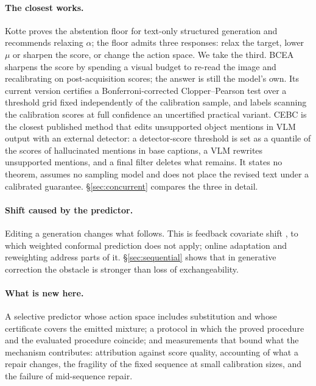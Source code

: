 \paragraph{The closest works.}
Kotte \citep{crcimposs} proves the abstention floor for text-only structured generation and
recommends relaxing $\alpha$; the floor admits three responses: relax the target, lower $\mu$ or
sharpen the score, or change the action space. We take the third. BCEA \citep{bcea} sharpens the
score by spending a visual budget to re-read the image and recalibrating on post-acquisition
scores; the answer is still the model's own. Its current version certifies a Bonferroni-corrected
Clopper--Pearson test over a threshold grid fixed independently of the calibration sample, and
labels scanning the calibration scores at full confidence an uncertified practical variant.
CEBC \citep{mishra2026cebc} is the closest published method that edits unsupported object
mentions in VLM output with an external detector: a detector-score threshold is set as a
quantile of the scores of hallucinated mentions in base captions, a VLM rewrites unsupported
mentions, and a final filter deletes what remains. It states no theorem, assumes no sampling
model and does not place the revised text under a calibrated guarantee. \S\ref{sec:concurrent}
compares the three in detail.

\paragraph{Shift caused by the predictor.}
Editing a generation changes what follows. This is feedback covariate shift
\citep{fannjiang2022fcs}, to which weighted conformal prediction \citep{tibshirani2019} does not
apply; online adaptation \citep{gibbs2021,onlineabstention} and reweighting \citep{anydist}
address parts of it. \S\ref{sec:sequential} shows that in generative correction the obstacle is
stronger than loss of exchangeability.

\paragraph{What is new here.}
A selective predictor whose action space includes substitution and whose certificate covers the
emitted mixture; a protocol in which the proved procedure and the evaluated procedure coincide;
and measurements that bound what the mechanism contributes: attribution against score quality, accounting
of what a repair changes, the fragility of the fixed sequence at small calibration sizes, and the
failure of mid-sequence repair.

